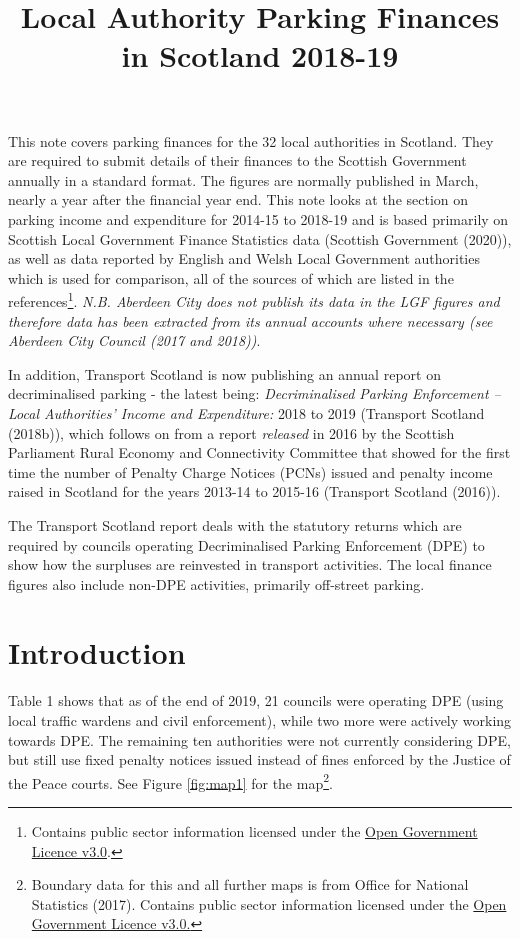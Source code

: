 \documentclass[
  12pt,
]{article}
\title{Local Authority Parking Finances in Scotland 2018-19}
\author{}
\date{\vspace{-2.5em}}
\begin{document}
\maketitle

\renewcommand{\arraystretch}{1.2}

This note covers parking finances for the 32 local authorities in Scotland. They are required to submit details of their finances to the Scottish Government annually in a standard format. The figures are normally published in March, nearly a year after the financial year end. This note looks at the section on parking income and expenditure for 2014-15 to 2018-19 and is based primarily on Scottish Local Government Finance Statistics data (Scottish Government (2020)), as well as data reported by English and Welsh Local Government authorities which is used for comparison, all of the sources of which are listed in the references\footnote{Contains public sector information licensed under the \href{http://www.nationalarchives.gov.uk/doc/open-government-licence/version/3/}{Open Government Licence v3.0}.}. \emph{N.B. Aberdeen City does not publish its data in the LGF figures and therefore data has been extracted from its annual accounts where necessary (see Aberdeen City Council (2017 and 2018))}.

In addition, Transport Scotland is now publishing an annual report on decriminalised parking - the latest being: \emph{Decriminalised Parking Enforcement -- Local Authorities' Income and Expenditure:} 2018 to 2019 (Transport Scotland (2018b)), which follows on from a report \emph{released} in 2016 by the Scottish Parliament Rural Economy and Connectivity Committee that showed for the first time the number of Penalty Charge Notices (PCNs) issued and penalty income raised in Scotland for the years 2013-14 to 2015-16 (Transport Scotland (2016)).

The Transport Scotland report deals with the statutory returns which are required by councils operating Decriminalised Parking Enforcement (DPE) to show how the surpluses are reinvested in transport activities. The local finance figures also include non-DPE activities, primarily off-street parking.

\hypertarget{introduction}{%
\section{Introduction}\label{introduction}}

Table 1 shows that as of the end of 2019, 21 councils were operating DPE (using local traffic wardens and civil enforcement), while two more were actively working towards DPE. The remaining ten authorities were not currently considering DPE, but still use fixed penalty notices issued instead of fines enforced by the Justice of the Peace courts. See Figure \ref{fig:map1} for the map\footnote{Boundary data for this and all further maps is from Office for National Statistics (2017). Contains public sector information licensed under the \href{http://www.nationalarchives.gov.uk/doc/open-government-licence/version/3/}{Open Government Licence v3.0.}}.
\end{document}
